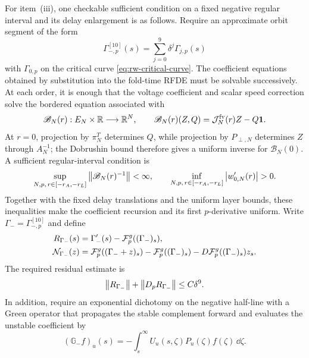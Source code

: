\begin{remark}
For item~\textup{(iii)}, one checkable sufficient condition on a fixed
negative regular interval and its delay enlargement is as follows.  Require
an approximate orbit segment of the form
\begin{equation}
 \Gamma_{-,p}^{[10]}(s)=\sum_{j=0}^{9}\delta^j\Gamma_{j,p}(s)
 \label{eq:supp-negative-slow-expansion}
\end{equation}
with \(\Gamma_{0,p}\) on the critical curve
\cref{eq:rw-critical-curve}.  The coefficient equations obtained by
substitution into the fold-time RFDE must be solvable successively.  At each
order, it is enough that the voltage coefficient and scalar speed correction
solve the bordered equation associated with
\begin{equation}
 \mathscr B_N(r):E_N\times\mathbb R\longrightarrow\mathbb R^N,
 \qquad
 \mathscr B_N(r)(Z,Q)=\mathcal J_N^{\rm fv}(r)Z-Q\mathbf1.
 \label{eq:supp-negative-bordered-map}
\end{equation}
At \(r=0\), projection by \(\pi_N^T\) determines \(Q\), while projection by
\(P_{\perp,N}\) determines \(Z\) through \(A_N^{-1}\); the Dobrushin bound
therefore gives a uniform inverse for \(\mathscr B_N(0)\).  A sufficient
regular-interval condition is
\[
 \sup_{N,p,\,r\in[-r_A,-r_L]}
 \left\lVert\mathscr B_N(r)^{-1}\right\rVert<\infty,
 \qquad
 \inf_{N,p,\,r\in[-r_A,-r_L]}\left\lvert w_{0,N}'(r)\right\rvert>0.
\]
Together with the fixed delay translations and the uniform layer bounds,
these inequalities make the coefficient recursion and its first
\(p\)-derivative uniform.  Write \(\Gamma_-=\Gamma_{-,p}^{[10]}\) and define
\begin{align}
 R_{\Gamma_-}(s)
 &=\Gamma_-'(s)-\mathcal F_p^g((\Gamma_-)_s),\notag\\
 \mathcal N_{\Gamma_-}(z)
 &=\mathcal F_p^g((\Gamma_-+z)_s)
   -\mathcal F_p^g((\Gamma_-)_s)
   -D\mathcal F_p^g((\Gamma_-)_s)z_s.
 \label{eq:supp-negative-residual-definition}
\end{align}
The required residual estimate is
\begin{equation}
 \left\lVert R_{\Gamma_-}\right\rVert+\left\lVert D_pR_{\Gamma_-}\right\rVert\le C\delta^9.
 \label{eq:supp-negative-residual}
\end{equation}
In addition, require an exponential dichotomy on the negative half-line with
a Green operator that propagates the stable complement forward and evaluates
the unstable coefficient by
\begin{equation}
 (\mathbb G_-f)_u(s)
 =-\int_s^\infty U_u(s,\zeta)P_u(\zeta)f(\zeta)\,\dd\zeta.
 \label{eq:supp-half-line-green}
\end{equation}

\end{remark}
